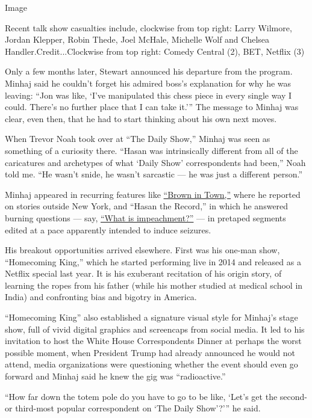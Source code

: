 Image

Recent talk show casualties include, clockwise from top right: Larry
Wilmore, Jordan Klepper, Robin Thede, Joel McHale, Michelle Wolf and
Chelsea Handler.Credit...Clockwise from top right: Comedy Central (2),
BET, Netflix (3)

Only a few months later, Stewart announced his departure from the
program. Minhaj said he couldn't forget his admired boss's explanation
for why he was leaving: ``Jon was like, `I've manipulated this chess
piece in every single way I could. There's no further place that I can
take it.''' The message to Minhaj was clear, even then, that he had to
start thinking about his own next moves.

When Trevor Noah took over at ``The Daily Show,'' Minhaj was seen as
something of a curiosity there. ``Hasan was intrinsically different from
all of the caricatures and archetypes of what `Daily Show'
correspondents had been,'' Noah told me. ``He wasn't snide, he wasn't
sarcastic --- he was just a different person.''

Minhaj appeared in recurring features like
\href{http://www.cc.com/video-clips/rtzt0s/the-daily-show-with-trevor-noah-brown-in-town---coal-country}{``Brown
in Town,''} where he reported on stories outside New York, and ``Hasan
the Record,'' in which he answered burning questions --- say,
\href{http://www.cc.com/video-clips/w7rowx/the-daily-show-with-trevor-noah-hasan-the-record---what-is-impeachment-}{``What
is impeachment?''} --- in pretaped segments edited at a pace apparently
intended to induce seizures.

His breakout opportunities arrived elsewhere. First was his one-man
show, ``Homecoming King,'' which he started performing live in 2014 and
released as a Netflix special last year. It is his exuberant recitation
of his origin story, of learning the ropes from his father (while his
mother studied at medical school in India) and confronting bias and
bigotry in America.

``Homecoming King'' also established a signature visual style for
Minhaj's stage show, full of vivid digital graphics and screencaps from
social media. It led to his invitation to host the White House
Correspondents Dinner at perhaps the worst possible moment, when
President Trump had already announced he would not attend, media
organizations were questioning whether the event should even go forward
and Minhaj said he knew the gig was ``radioactive.''

``How far down the totem pole do you have to go to be like, `Let's get
the second- or third-most popular correspondent on `The Daily Show'?'''
he said.

